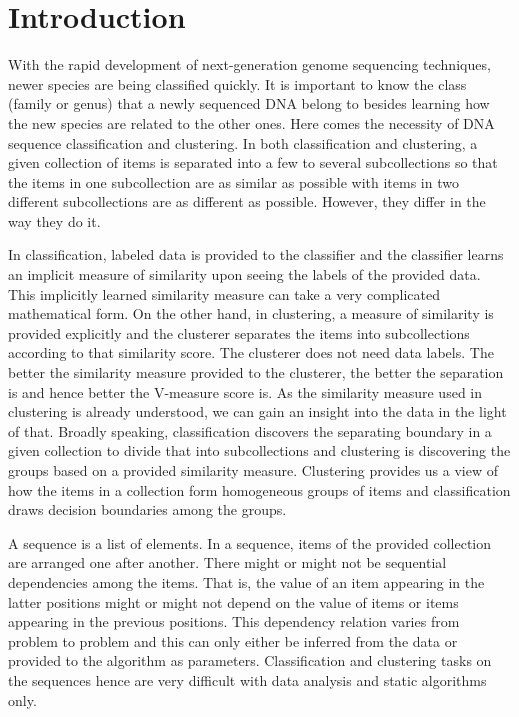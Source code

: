 \documentclass[oneside, twocolumn, a4paper, 10pt]{IEEEtran}
\begin{document}
\section{Introduction}
With the rapid development of next-generation genome sequencing techniques, newer species are being classified quickly. It is important to know the class (family or genus) that a newly sequenced DNA belong to besides learning how the new species are related to the other ones. Here comes the necessity of DNA sequence classification and clustering. In both classification and clustering, a given collection of items is separated into a few to several subcollections so that the items in one subcollection are as similar as possible with items in two different subcollections are as different as possible. However, they differ in the way they do it.\\
\par
In classification, labeled data is provided to the classifier and the classifier learns an implicit measure of similarity upon seeing the labels of the provided data. This implicitly learned similarity measure can take a very complicated mathematical form. On the other hand, in clustering, a measure of similarity is provided explicitly and the clusterer separates the items into subcollections according to that similarity score. The clusterer does not need data labels. The better the similarity measure provided to the clusterer, the better the separation is and hence better the V-measure score is. As the similarity measure used in clustering is already understood, we can gain an insight into the data in the light of that. Broadly speaking, classification discovers the separating boundary in a given collection to divide that into subcollections and clustering is discovering the groups based on a provided similarity measure. Clustering provides us a view of how the items in a collection form homogeneous groups of items and classification draws decision boundaries among the groups.\\
\par 
A sequence is a list of elements. In a sequence, items of the provided collection are arranged one after another. There might or might not be sequential dependencies among the items. That is, the value of an item appearing in the latter positions might or might not depend on the value of items or items appearing in the previous positions. This dependency relation varies from problem to problem and this can only either be inferred from the data or provided to the algorithm as parameters. Classification and clustering tasks on the sequences hence are very difficult with data analysis and static algorithms only.\\
\end{document}

